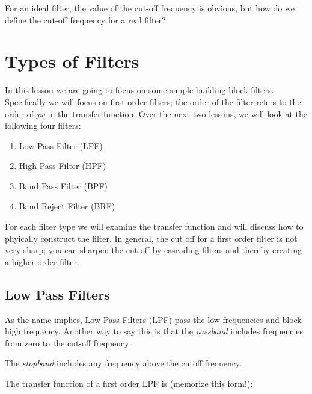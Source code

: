 \documentclass{handout}
\begin{document}
For an ideal filter, the value of the cut-off frequency is obvious, but how do we define the cut-off frequency for a real filter?  


\section{Types of Filters}
In this lesson we are going to focus on some simple building block filters.  Specifically we will focus on first-order filters; the order of the filter refers to the order of $j\omega$ in the transfer function.  Over the next two lessons, we will look at the following four filters:
\begin{enumerate}
\item Low Pass Filter (LPF)
\item High Pass Filter (HPF)
\item Band Pass Filter (BPF)
\item Band Reject Filter (BRF)
\end{enumerate}


For each filter type we will examine the transfer function and will discuss how to phyically construct the filter.  In general, the cut off for a first order filter is not very sharp; you can sharpen the cut-off by cascading filters and thereby creating a higher order filter.



\subsection{Low Pass Filters}
As the name implies, Low Pass Filters (LPF) pass the low frequencies and block high frequency.  Another way to say this is that the {\em passband} includes frequencies from zero to the cut-off frequency:

The {\em stopband} includes any frequency above the cutoff frequency.

The transfer function of a first order LPF is (memorize this form!):

\newpage
\clearpage
\pagebreak
\end{document}
